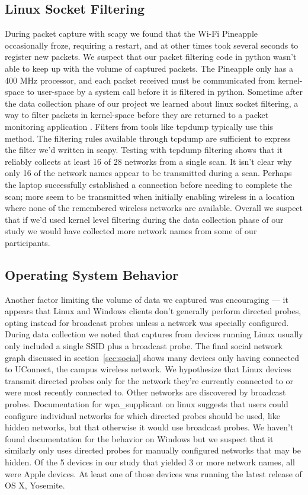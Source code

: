 \documentclass[letterpaper,twocolumn,10pt]{article}
\begin{document}
\subsection{Linux Socket Filtering}
\label{bpf}
During packet capture with scapy we found that the Wi-Fi Pineapple occasionally froze, requiring a restart, and at other times took several seconds to register new packets. We suspect that our packet filtering code in python wasn't able to keep up with the volume of captured packets. The Pineapple only has a 400 MHz processor, and each packet received must be communicated from kernel-space to user-space by a system call before it is filtered in python. Sometime after the data collection phase of our project we learned about linux socket filtering, a way to filter packets in kernel-space before they are returned to a packet monitoring application \cite{lpf}. Filters from tools like tcpdump typically use this method. The filtering rules available through tcpdump are sufficient to express the filter we'd written in scapy. Testing with tcpdump filtering shows that it reliably collects at least 16 of 28 networks from a single scan. It isn't clear why only 16 of the network names appear to be transmitted during a scan. Perhaps the laptop successfully established a connection before needing to complete the scan; more seem to be transmitted when initially enabling wireless in a location where none of the remembered wireless networks are available. Overall we suspect that if we'd used kernel level filtering during the data collection phase of our study we would have collected more network names from some of our participants.

\subsection{Operating System Behavior}
Another factor limiting the volume of data we captured was encouraging --- it appears that Linux and Windows clients don't generally perform directed probes, opting instead for broadcast probes unless a network was specially configured. During data collection we noted that captures from devices running Linux usually only included a single SSID plus a broadcast probe. The final social network graph discussed in section~\ref{sec:social} shows many devices only having connected to UConnect, the campus wireless network. We hypothesize that Linux devices transmit directed probes only for the network they're currently connected to or were most recently connected to. Other networks are discovered by broadcast probes. Documentation for wpa\_supplicant on linux suggests that users could configure individual networks for which directed probes should be used, like hidden networks, but that otherwise it would use broadcast probes. We haven't found documentation for the behavior on Windows but we suspect that it similarly only uses directed probes for manually configured networks that may be hidden. Of the 5 devices in our study that yielded 3 or more network names, all were Apple devices. At least one of those devices was running the latest release of OS X, Yosemite.
\end{document}
